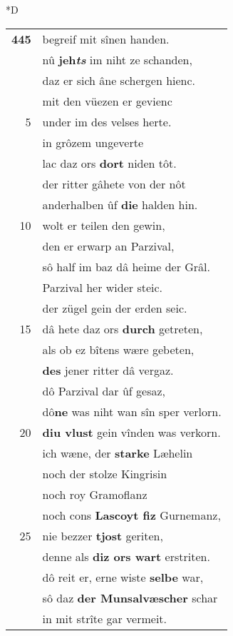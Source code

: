 \documentclass[8pt,a4paper,notitlepage]{article}
\begin{document}
\begin{table}[ht]
\begin{minipage}[t]{0.5\linewidth}
\small
\begin{center}*D
\end{center}
\begin{tabular}{rl}
\textbf{445} & begreif mit sînen handen.\\ 
 & nû \textbf{jeh\textit{ts}} im niht ze schanden,\\ 
 & daz er sich âne schergen hienc.\\ 
 & mit den vüezen er gevienc\\ 
5 & under im des velses herte.\\ 
 & in grôzem ungeverte\\ 
 & lac daz ors \textbf{dort} niden tôt.\\ 
 & der ritter gâhete von der nôt\\ 
 & anderhalben ûf \textbf{die} halden hin.\\ 
10 & wolt er teilen den gewin,\\ 
 & den er erwarp an Parzival,\\ 
 & sô half im baz dâ heime der Grâl.\\ 
 & Parzival her wider steic.\\ 
 & der zügel gein der erden seic.\\ 
15 & dâ hete daz ors \textbf{durch} getreten,\\ 
 & als ob ez bîtens wære gebeten,\\ 
 & \textbf{des} jener ritter dâ vergaz.\\ 
 & dô Parzival dar ûf gesaz,\\ 
 & dô\textbf{ne} was niht wan sîn sper verlorn.\\ 
20 & \textbf{diu vlust} gein vînden was verkorn.\\ 
 & ich wæne, der \textbf{starke} Læhelin\\ 
 & noch der stolze Kingrisin\\ 
 & noch roy Gramoflanz\\ 
 & noch cons \textbf{Lascoyt fiz} Gurnemanz,\\ 
25 & nie bezzer \textbf{tjost} geriten,\\ 
 & denne als \textbf{diz ors wart} erstriten.\\ 
 & dô reit er, erne wiste \textbf{selbe} war,\\ 
 & sô daz \textbf{der Munsalvæscher} schar\\ 
 & in mit strîte gar vermeit.\\ 

\end{tabular}
\end{minipage}
\end{table}
\end{document}
